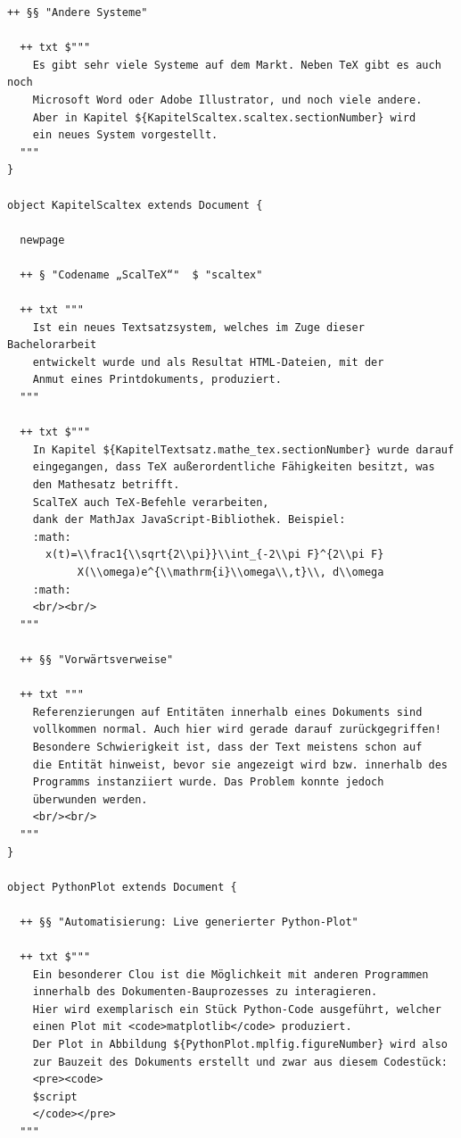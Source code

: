 \begin{lstlisting}[label=dsl-skript,caption=Ausführliches Scala DSL Dokument-Skript.]
  ++ §§ "Andere Systeme"

  ++ txt $"""
    Es gibt sehr viele Systeme auf dem Markt. Neben TeX gibt es auch noch
    Microsoft Word oder Adobe Illustrator, und noch viele andere.
    Aber in Kapitel ${KapitelScaltex.scaltex.sectionNumber} wird
    ein neues System vorgestellt.
  """
}

object KapitelScaltex extends Document {

  newpage

  ++ § "Codename „ScalTeX“"  $ "scaltex"

  ++ txt """
    Ist ein neues Textsatzsystem, welches im Zuge dieser Bachelorarbeit
    entwickelt wurde und als Resultat HTML-Dateien, mit der
    Anmut eines Printdokuments, produziert.
  """

  ++ txt $"""
    In Kapitel ${KapitelTextsatz.mathe_tex.sectionNumber} wurde darauf
    eingegangen, dass TeX außerordentliche Fähigkeiten besitzt, was
    den Mathesatz betrifft.
    ScalTeX auch TeX-Befehle verarbeiten,
    dank der MathJax JavaScript-Bibliothek. Beispiel:
    :math:
      x(t)=\\frac1{\\sqrt{2\\pi}}\\int_{-2\\pi F}^{2\\pi F}
           X(\\omega)e^{\\mathrm{i}\\omega\\,t}\\, d\\omega
    :math:
    <br/><br/>
  """

  ++ §§ "Vorwärtsverweise"

  ++ txt """
    Referenzierungen auf Entitäten innerhalb eines Dokuments sind
    vollkommen normal. Auch hier wird gerade darauf zurückgegriffen!
    Besondere Schwierigkeit ist, dass der Text meistens schon auf
    die Entität hinweist, bevor sie angezeigt wird bzw. innerhalb des
    Programms instanziiert wurde. Das Problem konnte jedoch
    überwunden werden.
    <br/><br/>
  """
}

object PythonPlot extends Document {

  ++ §§ "Automatisierung: Live generierter Python-Plot"

  ++ txt $"""
    Ein besonderer Clou ist die Möglichkeit mit anderen Programmen
    innerhalb des Dokumenten-Bauprozesses zu interagieren.
    Hier wird exemplarisch ein Stück Python-Code ausgeführt, welcher
    einen Plot mit <code>matplotlib</code> produziert.
    Der Plot in Abbildung ${PythonPlot.mplfig.figureNumber} wird also
    zur Bauzeit des Dokuments erstellt und zwar aus diesem Codestück:
    <pre><code>
    $script
    </code></pre>
  """


\end{lstlisting}
